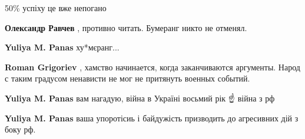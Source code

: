 \begin{itemize}
50\% успіху це вже непогано \Smiley[1.0][yellow]

\begin{itemize}
 
\textbf{Олександр Равчев} , противно читать. Бумеранг никто не отменял.

\begin{itemize}
 
\textbf{Yuliya M. Panas} ху*мєранг...

 
\textbf{Roman Grigoriev} , хамство начинается, когда заканчиваются аргументы. Народ с таким градусом ненависти не мог не притянуть военных событий.

 
\textbf{Yuliya M. Panas} вам нагадую, війна в Україні восьмий рік ☝️ війна з рф

 
\textbf{Yuliya M. Panas} ваша упоротісиь і байдужість призводить до агресивних дій з боку рф.

 

\end{itemize}
\end{itemize}
\end{itemize}
